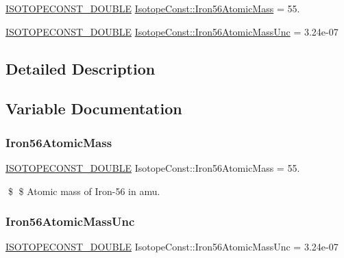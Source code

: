 \begin{DoxyCompactItemize}
\item 
\mbox{\hyperlink{group___isotope_const-_macros_ga8f45a7272ce02c0b4c65c44636ed719a}{I\+S\+O\+T\+O\+P\+E\+C\+O\+N\+S\+T\+\_\+\+D\+O\+U\+B\+LE}} \mbox{\hyperlink{group___isotope_const-_iron-_fe56_ga7558e8635d226ed84683abf027f079f7}{Isotope\+Const\+::\+Iron56\+Atomic\+Mass}} = 55.
\item 
\mbox{\hyperlink{group___isotope_const-_macros_ga8f45a7272ce02c0b4c65c44636ed719a}{I\+S\+O\+T\+O\+P\+E\+C\+O\+N\+S\+T\+\_\+\+D\+O\+U\+B\+LE}} \mbox{\hyperlink{group___isotope_const-_iron-_fe56_ga8b1b16cad78fca5ee61bc8e6fcfa49e1}{Isotope\+Const\+::\+Iron56\+Atomic\+Mass\+Unc}} = 3.\+24e-\/07
\end{DoxyCompactItemize}


\subsection{Detailed Description}


\subsection{Variable Documentation}
\mbox{\label{group___isotope_const-_iron-_fe56_ga7558e8635d226ed84683abf027f079f7}} 
\subsubsection{\texorpdfstring{Iron56\+Atomic\+Mass}{Iron56AtomicMass}}
{\footnotesize\ttfamily \mbox{\hyperlink{group___isotope_const-_macros_ga8f45a7272ce02c0b4c65c44636ed719a}{I\+S\+O\+T\+O\+P\+E\+C\+O\+N\+S\+T\+\_\+\+D\+O\+U\+B\+LE}} Isotope\+Const\+::\+Iron56\+Atomic\+Mass = 55.}

\$ \$ Atomic mass of Iron-\/56 in amu. \mbox{\label{group___isotope_const-_iron-_fe56_ga8b1b16cad78fca5ee61bc8e6fcfa49e1}} 
\subsubsection{\texorpdfstring{Iron56\+Atomic\+Mass\+Unc}{Iron56AtomicMassUnc}}
{\footnotesize\ttfamily \mbox{\hyperlink{group___isotope_const-_macros_ga8f45a7272ce02c0b4c65c44636ed719a}{I\+S\+O\+T\+O\+P\+E\+C\+O\+N\+S\+T\+\_\+\+D\+O\+U\+B\+LE}} Isotope\+Const\+::\+Iron56\+Atomic\+Mass\+Unc = 3.\+24e-\/07}

